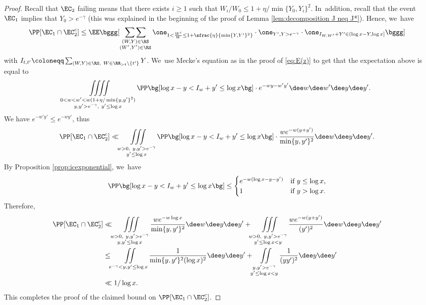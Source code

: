 \begin{proof} Recall that $\EC_2$ failing means that there exists $i\ge1$ such that $W_i/W_0\le 1+\eta/\min\{Y_0, Y_i\}^2$. In~addition, recall that the event $\EC_1$ implies that $Y_0 > e^{-\gamma}$ (this was explained in the beginning of the proof of Lemma \ref{lem:decomposition J neq J*}). Hence, we~have
\[
\PP[\EC_1 \cap \EC_2^c] \le
\EE\bggg[ \mathop{\sum\sum}_{\substack{(W,Y) \in \RS \\ (W',Y')\in\RS}} \one_{1< \frac{W'}{W} \le 1+\sfrac{\eta}{\min\{Y,Y'\}^2}}\cdot\one_{Y',Y>e^{-\gamma}} \cdot \one_{I_{W, W'} + Y'\in(\log x-Y,\log x]} \bggg]
\]
with $I_{t, t'} \coloneqq \sum_{(W, Y) \in \RS,\ W \in \RR_{>t}\setminus\{t'\}} Y$. We~use Mecke's equation as in the proof of \eqref{eq:E(z)} to get that the expectation above is equal to
\[
\iiiint\limits_{\substack{0 < w < w' < w(1+\eta/\min\{y,y'\}^2)\\ y, y' > e^{-\gamma},\ y'\le \log x}} \PP\bg[\log x - y<I_w + y' \le \log x\bg]\cdot e^{-wy-w'y'}
\dee w\dee w'\dee y\dee y'.
\]
We have $e^{-w'y'}\le e^{-wy'}$, thus
\[
\PP[\EC_1 \cap \EC_2^c] \ll
\iiint\limits_{\substack{w>0,\ y, y' > e^{-\gamma} \\ y'\le \log x}}
\PP\bg[\log x - y<I_w + y' \le \log x\bg]\cdot \frac{we^{-w(y+y')}}{\min\{y,y'\}^2} \dee w\dee y\dee y'.
\]
By Proposition \ref{prop:icexponential}, we~have
\[
\PP\bg[\log x - y<I_w + y' \le \log x\bg] \le \begin{cases}
e^{-w(\log x - y-y')}&\text{if $y \le \log x$,} \\
1 & \text{if $y > \log x$.}
\end{cases}
\]
Therefore,
\begin{align*}
\PP[\EC_1 \cap \EC_2^c]
&\ll \iiint\limits_{\substack{w>0,\ y, y' > e^{-\gamma} \\ y,y'\le \log x}}
\frac{we^{-w\log x}}{\min\{y,y'\}^2}\dee w\dee y\dee y'
+\iiint\limits_{\substack{w>0,\ y, y' > e^{-\gamma} \\ y'\le \log x<y}}
\frac{we^{-w(y+y')}}{(y')^2}\dee w\dee y\dee y' \\
&\le \iint\limits_{e^{-\gamma}<y, y'\le \log x}
\frac{1}{\min\{y,y'\}^2(\log x)^2}\dee y\dee y'
+\iint\limits_{\substack{y, y' > e^{-\gamma} \\ y'\le \log x<y}}
\frac{1}{(yy')^2} \dee y\dee y' \\
&\ll 1/\log x.
\end{align*}
This completes the proof of the claimed bound on $\PP[\EC_1\cap \EC_2^c]$.


\end{proof}
